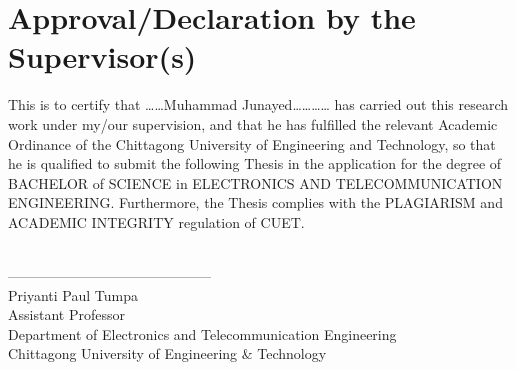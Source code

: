 \setcounter{secnumdepth}{-1}
\section{\hfil Approval/Declaration by the Supervisor(s) \hfil}
\vspace{1cm}
\thispagestyle{front}

\vspace{0.5cm}

\noindent This is to certify that ……Muhammad Junayed………… has carried out this research work under my/our supervision, and that he has fulfilled the relevant Academic Ordinance of the Chittagong University of Engineering and Technology, so that he is qualified to submit the following Thesis in the application for the degree of BACHELOR of SCIENCE in ELECTRONICS AND TELECOMMUNICATION ENGINEERING. Furthermore, the Thesis complies with the PLAGIARISM and ACADEMIC INTEGRITY regulation of CUET.

\vspace{1.5cm}

\begin{flushright}
 \\
-------------------------------------------- \\
Priyanti Paul Tumpa \\
Assistant Professor \\
Department of Electronics and Telecommunication Engineering \\
Chittagong University of Engineering \& Technology
\end{flushright}

\vspace{1.5cm}


\setcounter{secnumdepth}{3}

\clearpage